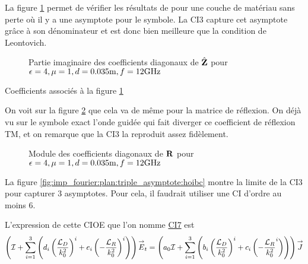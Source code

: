       La figure \ref{fig:imp_fourier:plan:soudais:hoibc} permet de vérifier les résultats de \cite[p.~11]{soudais_3d_2017} pour une couche de matériau sans perte où il y a une asymptote pour le symbole. La CI3 capture cet asymptote grâce à son dénominateur et est donc bien meilleure que la condition de Leontovich.
      \begin{figure}[!hbt]
          \centering
          
          \caption[CIOE sur empilement de P.~Soudais p.~11]{Partie imaginaire des coefficients diagonaux de \(\hat{\mathbf{Z}}\) pour \(\epsilon = 4, \mu = 1, d=0.035\text{m}, f=12\text{GHz}\)}
          \label{fig:imp_fourier:plan:soudais:hoibc}
      \end{figure}
      \begin{table}[!hbt]
        \centering
        \caption{Coefficients associés à la figure \ref{fig:imp_fourier:plan:soudais:hoibc}}
        \label{tab:imp_fourier:plan:soudais:hoibc}
      \end{table}

      On voit sur la figure \ref{fig:reflex_fourier:plan:soudais:hoibc} que cela va de même pour la matrice de réflexion. On déjà vu sur le symbole exact l'onde guidée qui fait diverger ce coefficient de réflexion TM, et on remarque que la CI3 la reproduit assez fidèlement.
      \begin{figure}[!hbt]
          \centering
          
          \caption[CIOE sur empilement de P.~Soudais p.~11]{Module des coefficients diagonaux de \(\mathbf{R}\) pour \(\epsilon = 4, \mu = 1, d=0.035\text{m}, f=12\text{GHz}\)}
          \label{fig:reflex_fourier:plan:soudais:hoibc}
      \end{figure}

      La figure \ref{fig:imp_fourier:plan:triple_asymptote:hoibc} montre la limite de la CI3 pour capturer 3 asymptotes. Pour cela, il faudrait utiliser une CI d'ordre au moins 6.

      L'expression de cette CIOE que l'on nomme \hyperlink{ci7}{CI7} est
      \begin{equation}
        \left({\mathcal{I}} + \sum_{i=1}^3 \left(d_{i} \left(\dfrac{{\mathcal{L}_D}}{k_0^2}\right)^i + e_{i} \left(-\dfrac{{\mathcal{L}_R}}{k_0^2}\right)^i \right)\right){\overset{\rightarrow}{E}}_t = \left(a_0 {\mathcal{I}} + \sum_{i=1}^3 \left(b_{i} \left(\dfrac{{\mathcal{L}_D}}{k_0^2}\right)^i + c_{i} \left(-\dfrac{{\mathcal{L}_R}}{k_0^2}^i\right) \right)\right){\overset{\rightarrow}{J}}
      \end{equation}

